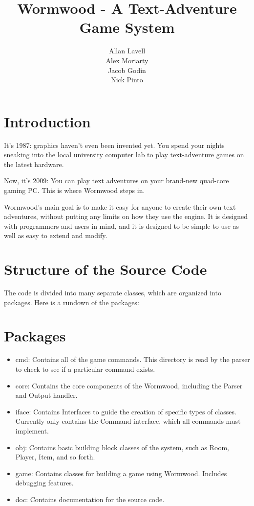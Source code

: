 \documentclass[12pt]{report}
\title{Wormwood - A Text-Adventure Game System}
\author{Allan Lavell \\ Alex Moriarty \\ Jacob Godin \\ Nick Pinto}
\begin{document}
\maketitle
\setcounter{secnumdepth}{0}
\section{Introduction}
It's 1987: graphics haven't even been invented yet. You spend your nights sneaking into the local university computer lab to play text-adventure games on the latest hardware. 

Now, it's 2009: You can play text adventures on your brand-new quad-core gaming PC. This is where Wormwood steps in.

Wormwood's main goal is to make it easy for anyone to create their own text adventures, without putting any limits on how they use the engine. It is designed with programmers and users in mind, and it is designed to be simple to use as well as easy to extend and modify.  

\section{Structure of the Source Code}
The code is divided into many separate 
classes, which are organized into packages. Here is a rundown of the packages:

\section{Packages}
\begin{itemize}
\item cmd: Contains all of the game commands. This directory is read by the parser to check to see if a particular command exists.
\item core: Contains the core components of the Wormwood, including the Parser and Output handler.
\item iface: Contains Interfaces to guide the creation of specific types of classes. Currently only contains the Command interface, which all commands must implement.
\item obj: Contains basic building block classes of the system, such as Room, Player, Item, and so forth.
\item game: Contains classes for building a game using Wormwood. Includes debugging features. 
\item doc: Contains documentation for the source code.
\end{itemize}
\end{document}
